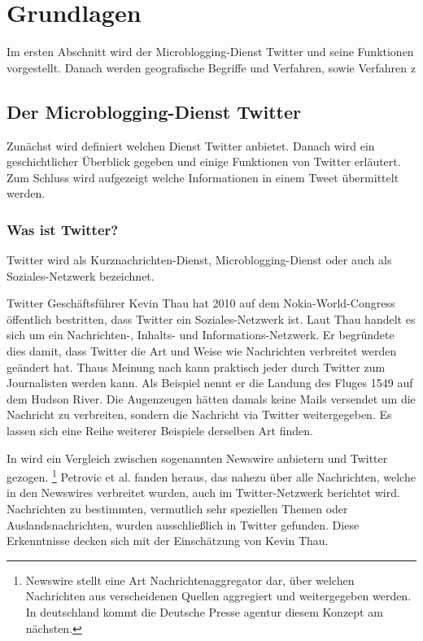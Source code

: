 \chapter{Grundlagen} \label{chp:Grundlagen}  
Im ersten Abschnitt wird der Microblogging-Dienst Twitter und seine Funktionen vorgestellt.
Danach werden geografische Begriffe und Verfahren, sowie Verfahren z


\newpage

	\section{Der Microblogging-Dienst Twitter} 
	
		Zunächst wird definiert welchen Dienst Twitter anbietet. 
		Danach wird ein geschichtlicher Überblick gegeben und einige Funktionen von Twitter erläutert.
		Zum Schluss wird aufgezeigt welche Informationen in einem Tweet übermittelt werden.

		\subsection{Was ist Twitter?}
		
			Twitter wird als Kurznachrichten-Dienst, Microblogging-Dienst oder auch als Soziales-Netzwerk bezeichnet. 

			Twitter Geschäftsführer Kevin Thau hat 2010 auf dem Nokia-World-Congress öffentlich bestritten, dass Twitter ein Soziales-Netzwerk ist. 
			Laut Thau handelt es sich um ein Nachrichten-, Inhalts- und Informations-Netzwerk. 
			Er begründete dies damit, dass Twitter die Art und Weise wie Nachrichten verbreitet werden geändert hat.
			Thaus Meinung nach kann praktisch jeder durch Twitter zum Journalisten werden kann. 
			Als Beispiel nennt er die Landung des Fluges 1549 auf dem Hudson River. 
			Die Augenzeugen hätten damals keine Mails versendet um die Nachricht zu verbreiten, sondern die Nachricht via Twitter weitergegeben.
			Es lassen sich eine Reihe weiterer Beispiele derselben Art finden. 

			In \cite{Petrovic2013} wird ein Vergleich zwischen sogenannten Newswire anbietern und Twitter gezogen. \footnote{Newswire stellt eine Art Nachrichtenaggregator dar, über welchen Nachrichten aus verscheidenen Quellen aggregiert und weitergegeben werden. In deutschland kommt die Deutsche Presse agentur diesem Konzept am nächsten.}
			Petrovic et al. fanden heraus, das nahezu über alle Nachrichten, welche in den Newswires verbreitet wurden, auch im Twitter-Netzwerk berichtet wird.
			Nachrichten zu bestimmten, vermutlich sehr speziellen Themen oder Auslandsnachrichten, wurden ausschließlich in Twitter gefunden. 
			Diese Erkenntnisse decken sich mit der Einschätzung von Kevin Thau.

